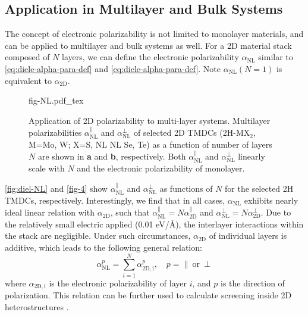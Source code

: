 \subsection{Application in Multilayer and Bulk Systems}
\label{sec:diel-apply-electr-polar}
The concept of electronic polarizability is not limited to monolayer
materials, and can be applied to multilayer and bulk systems as
well. For a 2D material stack composed of $N$ layers, we can define
the electronic polarizability $\alpha_{\mathrm{NL}}$ similar to
 \eqref{eq:diele-alpha-para-def} and \eqref{eq:diele-alpha-para-def}. Note
 $\alpha_{\mathrm{NL}}(N=1)$ is equivalent to $\alpha_{\mathrm{2D}}$.
 \begin{figure}[!htbp]
\centering
{fig-NL.pdf_tex}
\caption{\label{fig:diel-NL} %
  Application of 2D polarizability to multi-layer systems.  Multilayer
  polarizabilities $\alpha_{\mathrm{NL}}^{\parallel}$ and
  $\alpha_{\mathrm{NL}}^{\perp}$ of selected 2D TMDCs (2H-MX$_{2}$,
  M=Mo, W; X=S, NL NL Se, Te) as a function of number of layers $N$
  are shown in \textbf{a} and \textbf{b}, respectively.  Both
  $\alpha_{\mathrm{NL}}^{\parallel}$ and
  $\alpha_{\mathrm{NL}}^{\perp}$ linearly scale with $N$ and the
  electronic polarizability of monolayer.}
\end{figure}
%
 \autoref{fig:diel-NL} and \autoref{fig-4} show
$\alpha_{\mathrm{NL}}^{\parallel}$ and $\alpha_{\mathrm{NL}}^{\perp}$
as functions of $N$ for the selected 2H TMDCs,
respectively. Interestingly, we find that in all cases,
$\alpha_{\mathrm{NL}}$ exhibits nearly ideal linear relation with
$\alpha_{\mathrm{2D}}$, such that
$\alpha_{\mathrm{NL}}^{\parallel}= N \alpha_{\mathrm{2D}}^{\parallel}$
and $\alpha_{\mathrm{NL}}^{\perp}= N
\alpha_{\mathrm{2D}}^{\perp}$. Due to the relatively small
electric applied (0.01 eV/\AA{}), the interlayer interactions within
the stack are negligible. Under such circumstances, $\alpha_{\mathrm{2D}}$ of individual layers is additive, which leads to the following general relation:
\begin{equation}
  \label{eq:diele-alpha-nl}
  \alpha_{\mathrm{NL}}^{p} = \sum_{i=1}^{N} \alpha_{\mathrm{2D, i}}^{p},\quad p=\parallel\ \mathrm{or}\ \perp
\end{equation}
where $\alpha_{\mathrm{2D, i}}$ is the electronic polarizability of
layer $i$, and $p$ is the direction of polarization. This relation can
be further used to calculate screening inside 2D heterostructures
\cite{Kumar_2016_jpcc,Andersen_2015_dielec_vdWH}.
%
%
%

